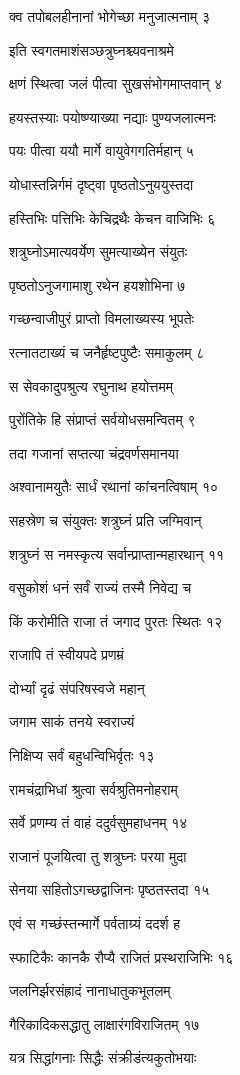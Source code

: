 क्व तपोबलहीनानां भोगेच्छा मनुजात्मनाम् ३

इति स्वगतमाशंसञ्छत्रुघ्नश्च्यवनाश्रमे

क्षणं स्थित्वा जलं पीत्वा सुखसंभोगमाप्तवान् ४

हयस्तस्याः पयोष्ण्याख्या नद्याः पुण्यजलात्मनः

पयः पीत्वा ययौ मार्गे वायुवेगगतिर्महान् ५

योधास्तन्निर्गमं दृष्ट्वा पृष्ठतोऽनुययुस्तदा

हस्तिभिः पत्तिभिः केचिद्रथैः केचन वाजिभिः ६

शत्रुघ्नोऽमात्यवर्येण सुमत्याख्येन संयुतः

पृष्ठतोऽनुजगामाशु रथेन हयशोभिना ७

गच्छन्वाजीपुरं प्राप्तो विमलाख्यस्य भूपतेः

रत्नातटाख्यं च जनैर्हृष्टपुष्टैः समाकुलम् ८

स सेवकादुपश्रुत्य रघुनाथ हयोत्तमम्

पुरोंतिके हि संप्राप्तं सर्वयोधसमन्वितम् ९

तदा गजानां सप्तत्या चंद्रवर्णसमानया

अश्वानामयुतैः सार्धं रथानां कांचनत्विषाम् १०

सहस्रेण च संयुक्तः शत्रुघ्नं प्रति जग्मिवान्

शत्रुघ्नं स नमस्कृत्य सर्वान्प्राप्तान्महारथान् ११

वसुकोशं धनं सर्वं राज्यं तस्मै निवेद्य च

किं करोमीति राजा तं जगाद पुरतः स्थितः १२

राजापि तं स्वीयपदे प्रणम्रं

दोर्भ्यां दृढं संपरिषस्वजे महान्

जगाम साकं तनये स्वराज्यं

निक्षिप्य सर्वं बहुधन्विभिर्वृतः १३

रामचंद्राभिधां श्रुत्वा सर्वश्रुतिमनोहराम्

सर्वे प्रणम्य तं वाहं ददुर्वसुमहाधनम् १४

राजानं पूजयित्वा तु शत्रुघ्नः परया मुदा

सेनया सहितोऽगच्छद्वाजिनः पृष्ठतस्तदा १५

एवं स गच्छंस्तन्मार्गे पर्वताग्र्यं ददर्श ह

स्फाटिकैः कानकै रौप्यै राजितं प्रस्थराजिभिः १६

जलनिर्झरसंह्रादं नानाधातुकभूतलम्

गैरिकादिकसद्धातु लाक्षारंगविराजितम् १७

यत्र सिद्धांगनाः सिद्धैः संक्रीडंत्यकुतोभयाः

